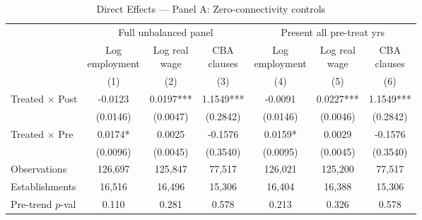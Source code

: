 \begin{table}[H]
\centering
\scriptsize
\caption{Direct Effects — Panel A: Zero-connectivity controls}
\begin{tabular}{lcccccc}
\toprule
& \multicolumn{3}{c}{Full unbalanced panel} & \multicolumn{3}{c}{Present all pre-treat yrs} \\
\cmidrule(lr){2-4} \cmidrule(lr){5-7}
& \shortstack{Log\\employment} & \shortstack{Log real\\wage} & \shortstack{CBA\\clauses} & \shortstack{Log\\employment} & \shortstack{Log real\\wage} & \shortstack{CBA\\clauses} \\
& (1) & (2) & (3) & (4) & (5) & (6) \\
\midrule
Treated $\times$ Post & -0.0123 & 0.0197*** & 1.1549*** & -0.0091 & 0.0227*** & 1.1549*** \\
& (0.0146) & (0.0047) & (0.2842) & (0.0146) & (0.0046) & (0.2842) \\[3pt]
Treated $\times$ Pre & 0.0174* & 0.0025 & -0.1576 & 0.0159* & 0.0029 & -0.1576 \\
& (0.0096) & (0.0045) & (0.3540) & (0.0095) & (0.0045) & (0.3540) \\[3pt]
\midrule
Observations & 126,697 & 125,847 & 77,517 & 126,021 & 125,200 & 77,517 \\
Establishments & 16,516 & 16,496 & 15,306 & 16,404 & 16,388 & 15,306 \\
Pre-trend $p$-val & 0.110 & 0.281 & 0.578 & 0.213 & 0.326 & 0.578 \\
\bottomrule
\end{tabular}
\begin{minipage}{\textwidth}
\footnotesize
\medskip

\end{minipage}
\end{table}
